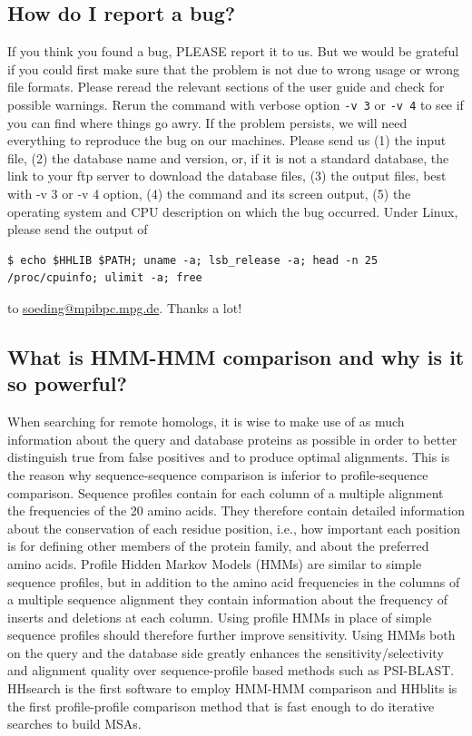 \documentclass[11pt,a4paper]{article}
\begin{document}
\subsection{How do I report a bug? \label{report-bug}}
If you think you found a bug, PLEASE report it to us. But we would be grateful if you could first make sure that the problem is not due to wrong usage or wrong file formats. Please reread the relevant sections of the user guide and check for possible warnings. Rerun the command with verbose option \verb`-v 3` or \verb`-v 4` to see if you can find where things go awry. If the problem persists, we will need everything to reproduce the bug on our machines. Please send us (1) the input file, (2) the database name and version, or, if it is not a standard database, the link to your ftp server to download the database files, (3) the output files, best with -v 3 or -v 4 option, (4) the command and its screen output, (5) the operating system and CPU description on which the bug occurred. Under Linux, please send the output of 
\small
\begin{verbatim}
$ echo $HHLIB $PATH; uname -a; lsb_release -a; head -n 25 /proc/cpuinfo; ulimit -a; free
\end{verbatim}
\normalsize
to \url{soeding@mpibpc.mpg.de}. Thanks a lot!

\subsection{What is HMM-HMM comparison and why is it so powerful?}
When searching for remote homologs, it is wise to make use of as much information about the query and database proteins as possible in order to better distinguish true from false positives and to produce optimal alignments. This is the reason why sequence-sequence comparison is inferior to profile-sequence comparison. Sequence profiles contain for each column of a multiple alignment the frequencies of the 20 amino acids. They therefore contain detailed information about the conservation of each residue position, i.e., how important each position is for defining other members of the protein family, and about the preferred amino acids. Profile Hidden Markov Models (HMMs) are similar to simple sequence profiles, but in addition to the amino acid frequencies in the columns of a multiple sequence alignment they contain information about the frequency of inserts and deletions at each column. Using profile HMMs in place of simple sequence profiles should therefore further improve sensitivity. Using HMMs both on the query and the database side greatly enhances the sensitivity/selectivity and alignment quality over sequence-profile based methods such as PSI-BLAST. HHsearch is the first software to employ HMM-HMM comparison and HHblits is the first profile-profile comparison method that is fast enough to do iterative searches to build MSAs. 
\end{document}
